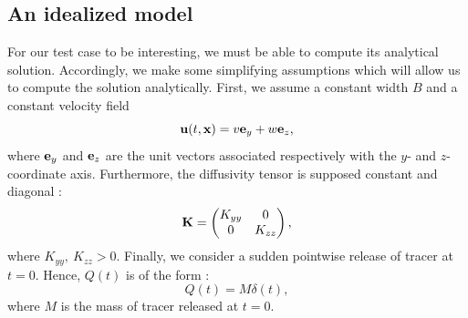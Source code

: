 \subsection{An idealized model}
For our test case to be interesting, we must be able to compute its analytical solution. Accordingly, we make some simplifying assumptions which will allow us to compute the solution analytically.
First, we assume a constant width $B$ and a constant velocity field
\begin{equation} \label{eq:testcase:velocity}
	\mathbf{u}(t,\mathbf{x}) = v \mathbf e_y + w \mathbf e_z,
\end{equation}
where $\mathbf e_y$ and $\mathbf e_z$ are the unit vectors associated respectively with the $y$- and $z$-coordinate axis. Furthermore, the diffusivity tensor is supposed constant and diagonal :
\begin{equation} \label{eq:testcase:diffusivity}
	\mathbf{K} = \begin{pmatrix}
			K_{yy} & 0 \\
			0 & K_{zz}
			\end{pmatrix},
\end{equation}
where $K_{yy},\ K_{zz} > 0$. Finally, we consider a sudden pointwise release of tracer at $t=0$. Hence, $Q(t)$ is of the form :
\begin{equation}
	Q(t) = M\delta(t),
\end{equation} 
where $M$ is the mass of tracer released at $t=0$.

